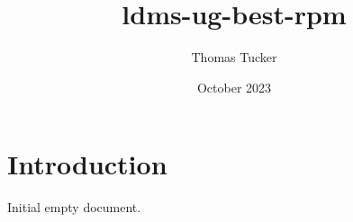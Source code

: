 \documentclass{article}
\title{ldms-ug-best-rpm}
\author{Thomas Tucker}
\date{October 2023}
\begin{document}
\section{Introduction}
Initial empty document.
\end{document}
